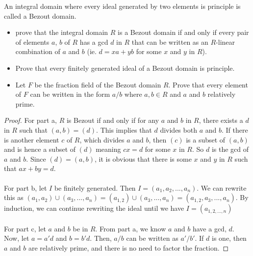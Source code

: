 \documentclass[10pt]{article}
\newenvironment{problem}[2][Problem]{\begin{trivlist}
		\item[\hskip \labelsep {\bfseries #1}\hskip \labelsep {\bfseries #2.}]}{\end{trivlist}}
\begin{document}
		\begin{problem}{2.7}
			An integral domain where every ideal generated by two elements is principle is called a Bezout domain.
			\begin{itemize}
				\item[(a)]prove that the integral domain $R$ is a Bezout domain if and only if every pair of elements $a$, $b$ of $R$ has a gcd $d$ in $R$ that can be written as an $R$-linear combination of $a$ and $b$ (ie. $d=xa+yb$ for some $x$ and $y$ in $R$).
				\item[(b)]Prove that every finitely generated ideal of a Bezout domain is principle.
				\item[(c)] Let $F$ be the fraction field of the Bezout domain $R$. Prove that every element of $F$ can be written in the form $a/b$ where $a,b \in R$ and $a$ and $b$ relatively prime.
			\end{itemize}
			
			\begin{proof}
				For part a, $R$ is Bezout if and only if for any $a$ and $b$ in $R$, there exists a $d$ in $R$ such that $(a,b)=(d)$. This implies that $d$ divides both $a$ and $b$. If there is another element $c$ of $R$, which divides $a$ and $b$, then $(c)$ is a subset of $(a,b)$ and is hence a subset of $(d)$ meaning $cx=d$ for some $x$ in $R$. So $d$ is the gcd of $a$ and $b$. Since $(d)=(a,b)$, it is obvious that there is some $x$ and $y$ in $R$ such that $ax+by=d$.\\
				\\
				For part b, let $I$ be finitely generated. Then $I = (a_{1}, a_{2}, ... ,a_{n})$. We can rewrite this as $(a_{1}, a_{2}) \cup (a_{3}, ... , a_{n}) = (a_{1,2}) \cup (a_{3}, ... , a_{n}) = (a_{1,2}, a_{3}, ... , a_{n})$. By induction, we can continue rewriting the ideal until we have $I=(a_{1,2,...,n})$\\
				\\
				For part c, let $a$ and $b$ be in $R$. From part a, we know $a$ and $b$ have a gcd, $d$. Now, let $a = a'd$ and $b=b'd$. Then, $a/b$ can be written as $a'/b'$. If $d$ is one, then $a$ and $b$ are relatively prime, and there is no need to factor the fraction.
			\end{proof}
		\end{problem}
		
	
		
		
		
\end{document}
